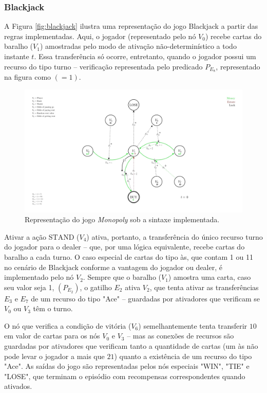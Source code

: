 \documentclass[conference]{IEEEtran}
\begin{document}
\subsubsection{Blackjack}
A Figura \ref{fig:blackjack} ilustra uma representação do jogo Blackjack a partir das regras implementadas. Aqui, o jogador (representado pelo nó $V_0$) recebe cartas do baralho ($V_1$) amostradas pelo modo de ativação não-determinístico a todo instante $t$. Essa transferência só ocorre, entretanto, quando o jogador possui um recurso do tipo turno -- verificação representada pelo predicado $P_{E_8}$, representado na figura como $(= 1)$.

\begin{figure}[h!]
    \centering
    \includegraphics[width=1.2\linewidth]{figures/Monopoly.png}
    \caption{Representação do jogo \textit{Monopoly} sob a sintaxe implementada.}
    \label{fig:my-monopoly}
\end{figure}

Ativar a ação $\text{STAND}$ ($V_4$) ativa, portanto, a transferência do único recurso turno do jogador para o dealer -- que, por uma lógica equivalente, recebe cartas do baralho a cada turno. O caso especial de cartas do tipo às, que contam 1 ou 11 no cenário de Blackjack conforme a vantagem do jogador ou dealer, é implementado pelo nó $V_2$. Sempre que o baralho ($V_1$) amostra uma carta, caso seu valor seja 1, $(P_{E_2})$, o gatilho $E_2$ ativa $V_2$, que tenta ativar as transferências $E_3$ e $E_7$ de um recurso do tipo "Ace" -- guardadas por ativadores que verificam se $V_0$ ou $V_3$ têm o turno.

O nó que verifica a condição de vitória ($V_6$) semelhantemente tenta transferir $10$ em valor de cartas para os nós $V_0$ e $V_3$ -- mas as conexões de recursos são guardadas por ativadores que verificam tanto a quantidade de cartas (um às não pode levar o jogador a mais que $21$) quanto a existência de um recurso do tipo "Ace". As saídas do jogo são representadas pelos nós especiais "WIN", "TIE" e "LOSE", que terminam o episódio com recompensas correspondentes quando ativados.
\end{document}
